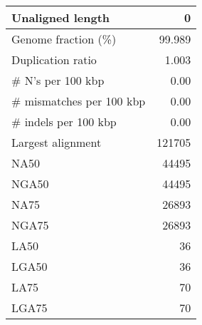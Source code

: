 \documentclass[12pt,a4paper]{article}
\begin{document}
\begin{table}[ht]
\begin{center}
\begin{tabular}{|l*{1}{|r}|}
Unaligned length & 0 \\ \hline
Genome fraction (\%) & 99.989 \\ \hline
Duplication ratio & 1.003 \\ \hline
\# N's per 100 kbp & 0.00 \\ \hline
\# mismatches per 100 kbp & 0.00 \\ \hline
\# indels per 100 kbp & 0.00 \\ \hline
Largest alignment & 121705 \\ \hline
NA50 & 44495 \\ \hline
NGA50 & 44495 \\ \hline
NA75 & 26893 \\ \hline
NGA75 & 26893 \\ \hline
LA50 & 36 \\ \hline
LGA50 & 36 \\ \hline
LA75 & 70 \\ \hline
LGA75 & 70 \\ \hline
\end{tabular}
\end{center}
\end{table}
\end{document}
